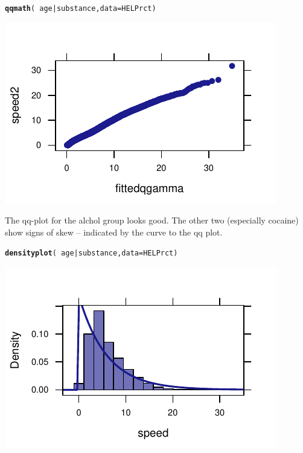 \documentclass[twoside]{book}\usepackage[]{graphicx}\usepackage[]{xcolor}
\makeatletter
\def\maxwidth{ %
  \ifdim\Gin@nat@width>\linewidth
    \linewidth
  \else
    \Gin@nat@width
  \fi
}
\newcommand{\hlopt}[1]{\textcolor[rgb]{0,0,0}{#1}}%
\newcommand{\hlstd}[1]{\textcolor[rgb]{0.345,0.345,0.345}{#1}}%
\newcommand{\hlkwc}[1]{\textcolor[rgb]{0.333,0.667,0.333}{#1}}%
\newcommand{\hlkwd}[1]{\textcolor[rgb]{0.737,0.353,0.396}{\textbf{#1}}}%
\newenvironment{kframe}{%
 \def\at@end@of@kframe{}%
 \ifinner\ifhmode%
  \def\at@end@of@kframe{\end{minipage}}%
  \begin{minipage}{\columnwidth}%
 \fi\fi%
 \def\FrameCommand##1{\hskip\@totalleftmargin \hskip-\fboxsep
 \colorbox{shadecolor}{##1}\hskip-\fboxsep
     \hskip-\linewidth \hskip-\@totalleftmargin \hskip\columnwidth}%
 \MakeFramed {\advance\hsize-\width
   \@totalleftmargin\z@ \linewidth\hsize
   \@setminipage}}%
 {\par\unskip\endMakeFramed%
 \at@end@of@kframe}
\newenvironment{knitrout}{}{} %
\makeatother
\begin{document}
\begin{solution}
\begin{knitrout}
\color{fgcolor}\begin{kframe}
\begin{alltt}
\hlkwd{qqmath}\hlstd{(}\hlopt{~}\hlstd{age} \hlopt{|} \hlstd{substance,} \hlkwc{data} \hlstd{= HELPrct)}
\end{alltt}
\end{kframe}

{\centering \includegraphics[width=\maxwidth]{figures/fig-unnamed-chunk-113-1} 

}



\end{knitrout}
The qq-plot for the alchol group looks good.  The other two (especially cocaine) show
signs of skew -- indicated by the curve to the qq plot.
\begin{knitrout}
\color{fgcolor}\begin{kframe}
\begin{alltt}
\hlkwd{densityplot}\hlstd{(}\hlopt{~}\hlstd{age} \hlopt{|} \hlstd{substance,} \hlkwc{data} \hlstd{= HELPrct)}
\end{alltt}
\end{kframe}

{\centering \includegraphics[width=\maxwidth]{figures/fig-unnamed-chunk-114-1} 

}



\end{knitrout}
\end{solution}
\end{document}
